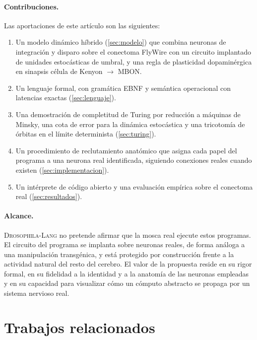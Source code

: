 \documentclass[11pt,a4paper]{article}
\theoremstyle{plain}
\theoremstyle{definition}
\theoremstyle{remark}
\newcommand{\dros}{\textup{\textsc{Drosophila-Lang}}}
\begin{document}
\paragraph{Contribuciones.} Las aportaciones de este artículo son las siguientes:
\begin{enumerate}[leftmargin=*,itemsep=2pt]
  \item Un modelo dinámico híbrido (\cref{sec:modelo}) que combina neuronas de
        integración y disparo sobre el conectoma FlyWire con un circuito
        implantado de unidades estocásticas de umbral, y una regla de
        plasticidad dopaminérgica en sinapsis célula de Kenyon $\to$ MBON.
  \item Un lenguaje formal, con gramática EBNF y semántica operacional con
        latencias exactas (\cref{sec:lenguaje}).
  \item Una demostración de completitud de Turing por reducción a máquinas
        de Minsky, una cota de error para la dinámica estocástica y una
        tricotomía de órbitas en el límite determinista (\cref{sec:turing}).
  \item Un procedimiento de reclutamiento anatómico que asigna cada papel del
        programa a una neurona real identificada, siguiendo conexiones reales
        cuando existen (\cref{sec:implementacion}).
  \item Un intérprete de código abierto y una evaluación empírica sobre el
        conectoma real (\cref{sec:resultados}).
\end{enumerate}

\paragraph{Alcance.} \dros{} no pretende afirmar que la mosca real ejecute
estos programas. El circuito del programa se implanta sobre neuronas reales,
de forma análoga a una manipulación transgénica, y está protegido por
construcción frente a la actividad natural del resto del cerebro. El valor de
la propuesta reside en su rigor formal, en su fidelidad a la identidad y a la
anatomía de las neuronas empleadas y en su capacidad para visualizar cómo un
cómputo abstracto se propaga por un sistema nervioso real.

\section{Trabajos relacionados}
\label{sec:relacionados}
\end{document}
